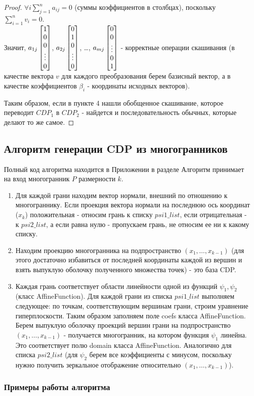 \documentclass[fontsize=14pt]{scrartcl}
\theoremstyle{definition}
\begin{document}
\begin{proof}
$\forall i \sum_{j=1}^na_{ij} = 0$ (суммы коэффициентов в столбцах), поскольку $\sum_{i=1}^{n} v_i = 0$. 
\\
Значит, $a_{1j}\begin{bmatrix} 1 \\ 0 \\ 0 \\ \vdots \\ 0 \end{bmatrix}$, $a_{2j}\begin{bmatrix} 0 \\ 1 \\ 0 \\ \vdots \\ 0 \end{bmatrix}$, \dots, $a_{mj}\begin{bmatrix} 0 \\ 0 \\ \vdots \\ 0 \\ 1 \end{bmatrix}$ -  корректные операции скашивания (в качестве вектора $v$ для каждого преобразования берем базисный вектор, а в качестве коэффициентов $\beta_i$ - координаты исходных векторов).

Таким образом, если в пункте 4 нашли обобщенное скашивание, которое переводит $CDP_1$ в $CDP_2$ - найдется и последовательность обычных, которые делают то же самое.
\end{proof}

\subsection{Алгоритм генерации CDP из многогранников}
Полный код алгоритма находится в Приложении в разделе \pageref{gen}
Алгоритм принимает на вход многогранник $P$ размерности $k$.
\begin{enumerate}
	\item Для каждой грани находим вектор нормали, внешний по отношению к многограннику. Если проекция вектора нормали на последнюю ось координат ($x_k$) положительная - относим грань к списку $psi1\_list$, если отрицательная - к $psi2\_list$, а если равна нулю - пропускаем грань, не относим ее ни к какому списку.
	\item Находим проекцию многогранника на подпространство $(x_1, \dots, x_{k-1})$ (для этого достаточно избавиться от последней координаты каждой из вершин и взять выпуклую оболочку полученного множества точек) - это база CDP.
	\item Каждая грань соответствует области линейности одной из функций $\psi_1, \psi_2$ (класс AffineFunction). Для каждой грани из списка $psi1\_list$ выполняем следующее: по точкам, соответствующим вершинам грани, строим уравнение гиперплоскости. Таким образом заполняем поле coefs  класса AffineFunction. Берем выпуклую оболочку проекций вершин грани на подпространство $(x_1, \dots, x_{k-1})$ - получается многогранник, на котором функция $\psi_1$ линейна. Это соответствует полю domain класса AffineFunction. Аналогично для списка  $psi2\_list$ (для $\psi_2$ берем все коэффициенты с минусом, поскольку нужно получить зеркальное отображение относительно $(x_1, \dots, x_{k-1})$).
\end{enumerate}

\subsubsection{Примеры работы алгоритма}
\end{document}
